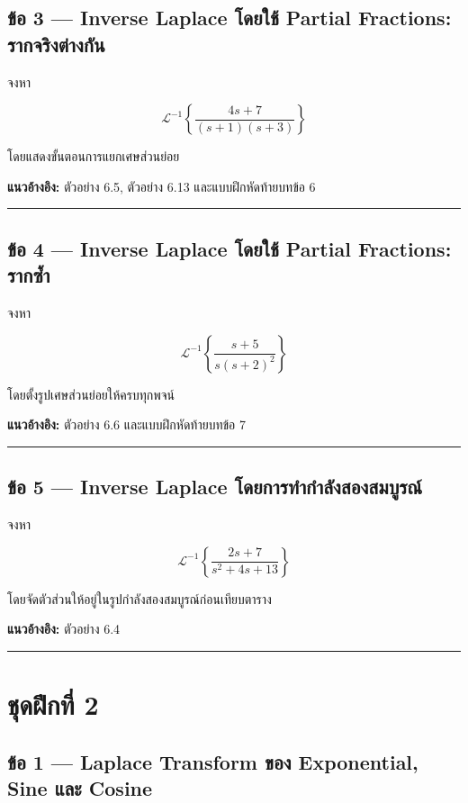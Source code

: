 \subsection{ข้อ 3 — Inverse Laplace โดยใช้ Partial Fractions: รากจริงต่างกัน}

จงหา

\[
\mathcal{L}^{-1}
\left\{
\frac{4s+7}{(s+1)(s+3)}
\right\}
\]

โดยแสดงขั้นตอนการแยกเศษส่วนย่อย

\textbf{แนวอ้างอิง:} ตัวอย่าง 6.5, ตัวอย่าง 6.13 และแบบฝึกหัดท้ายบทข้อ 6

\par\noindent\rule{\textwidth}{0.4pt}\par

\subsection{ข้อ 4 — Inverse Laplace โดยใช้ Partial Fractions: รากซ้ำ}

จงหา

\[
\mathcal{L}^{-1}
\left\{
\frac{s+5}{s(s+2)^2}
\right\}
\]

โดยตั้งรูปเศษส่วนย่อยให้ครบทุกพจน์

\textbf{แนวอ้างอิง:} ตัวอย่าง 6.6 และแบบฝึกหัดท้ายบทข้อ 7

\par\noindent\rule{\textwidth}{0.4pt}\par

\subsection{ข้อ 5 — Inverse Laplace โดยการทำกำลังสองสมบูรณ์}

จงหา

\[
\mathcal{L}^{-1}
\left\{
\frac{2s+7}{s^2+4s+13}
\right\}
\]

โดยจัดตัวส่วนให้อยู่ในรูปกำลังสองสมบูรณ์ก่อนเทียบตาราง

\textbf{แนวอ้างอิง:} ตัวอย่าง 6.4

\par\noindent\rule{\textwidth}{0.4pt}\par

\newpage

\section{ชุดฝึกที่ 2}

\subsection{ข้อ 1 — Laplace Transform ของ Exponential, Sine และ Cosine}

